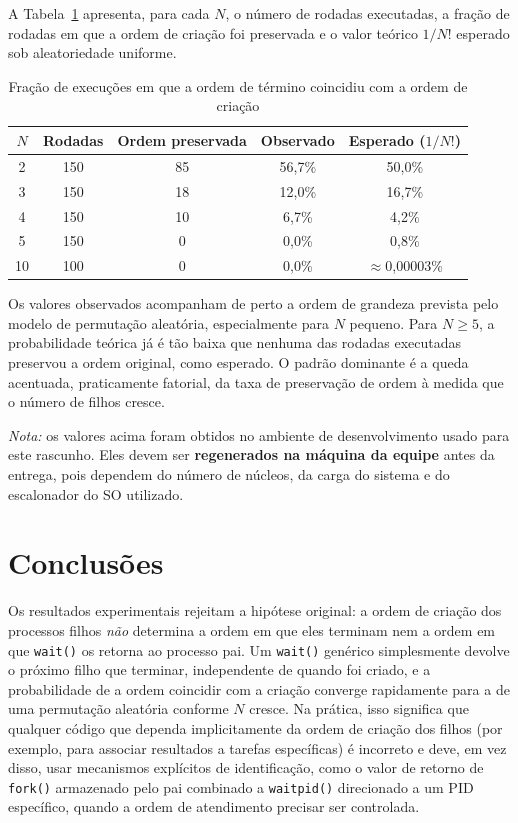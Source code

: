 \documentclass[conference]{IEEEtran}
\begin{document}
A Tabela~\ref{tab:resultados} apresenta, para cada $N$, o número de rodadas
executadas, a fração de rodadas em que a ordem de criação foi preservada e o
valor teórico $1/N!$ esperado sob aleatoriedade uniforme.

\begin{table}[htbp]
\caption{Fração de execuções em que a ordem de término coincidiu com a ordem de criação}
\label{tab:resultados}
\centering
\begin{tabular}{@{}ccccc@{}}
\toprule
$N$ & Rodadas & Ordem preservada & Observado & Esperado ($1/N!$) \\
\midrule
2  & 150 & 85  & 56{,}7\% & 50{,}0\% \\
3  & 150 & 18  & 12{,}0\% & 16{,}7\% \\
4  & 150 & 10  & 6{,}7\%  & 4{,}2\%  \\
5  & 150 & 0   & 0{,}0\%  & 0{,}8\%  \\
10 & 100 & 0   & 0{,}0\%  & $\approx$0{,}00003\% \\
\bottomrule
\end{tabular}
\end{table}

Os valores observados acompanham de perto a ordem de grandeza prevista pelo
modelo de permutação aleatória, especialmente para $N$ pequeno. Para
$N \geq 5$, a probabilidade teórica já é tão baixa que nenhuma das rodadas
executadas preservou a ordem original, como esperado. O padrão dominante é a
queda acentuada, praticamente fatorial, da taxa de preservação de ordem à
medida que o número de filhos cresce.

\emph{Nota:} os valores acima foram obtidos no ambiente de desenvolvimento
usado para este rascunho. Eles devem ser \textbf{regenerados na máquina da
equipe} antes da entrega, pois dependem do número de núcleos, da carga do
sistema e do escalonador do SO utilizado.

\section{Conclusões}

Os resultados experimentais rejeitam a hipótese original: a ordem de criação
dos processos filhos \emph{não} determina a ordem em que eles terminam nem a
ordem em que \texttt{wait()} os retorna ao processo pai. Um \texttt{wait()}
genérico simplesmente devolve o próximo filho que terminar, independente de
quando foi criado, e a probabilidade de a ordem coincidir com a criação
converge rapidamente para a de uma permutação aleatória conforme $N$ cresce.
Na prática, isso significa que qualquer código que dependa implicitamente da
ordem de criação dos filhos (por exemplo, para associar resultados a tarefas
específicas) é incorreto e deve, em vez disso, usar mecanismos explícitos de
identificação, como o valor de retorno de \texttt{fork()} armazenado pelo pai
combinado a \texttt{waitpid()} direcionado a um PID específico, quando a
ordem de atendimento precisar ser controlada.
\end{document}
